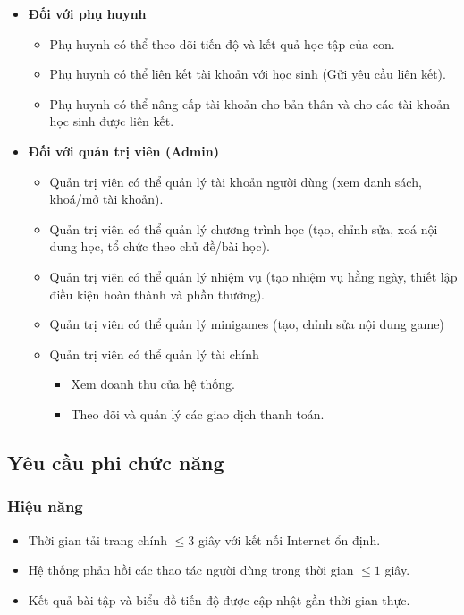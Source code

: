 \begin{itemize}
    \item \textbf{Đối với phụ huynh}
    \begin{itemize}
        \item Phụ huynh có thể theo dõi tiến độ và kết quả học tập của con.
        \item Phụ huynh có thể liên kết tài khoản với học sinh (Gửi yêu cầu liên kết).
        \item Phụ huynh có thể nâng cấp tài khoản cho bản thân và cho các tài khoản học sinh được liên kết.
    \end{itemize}
  \item \textbf{Đối với quản trị viên (Admin)}
  \begin{itemize}
  	\item Quản trị viên có thể quản lý tài khoản người dùng (xem danh sách, khoá/mở tài khoản).
  	\item Quản trị viên có thể quản lý chương trình học (tạo, chỉnh sửa, xoá nội dung học, tổ chức theo chủ đề/bài học).
  	\item Quản trị viên có thể quản lý nhiệm vụ (tạo nhiệm vụ hằng ngày, thiết lập điều kiện hoàn thành và phần thưởng).
  	\item Quản trị viên có thể quản lý minigames (tạo, chỉnh sửa nội dung game)
  	\item Quản trị viên có thể quản lý tài chính
  	\begin{itemize}
  		\item Xem doanh thu của hệ thống.
  		\item Theo dõi và quản lý các giao dịch thanh toán.
  	\end{itemize}
  \end{itemize}
\end{itemize}


\subsection{Yêu cầu phi chức năng}

\subsubsection{Hiệu năng}
\begin{itemize}[leftmargin=2.0cm]
	\item Thời gian tải trang chính $\leq 3$ giây với kết nối Internet ổn định.
	\item Hệ thống phản hồi các thao tác người dùng trong thời gian $\leq 1$ giây.
	\item Kết quả bài tập và biểu đồ tiến độ được cập nhật gần thời gian thực.
\end{itemize}

